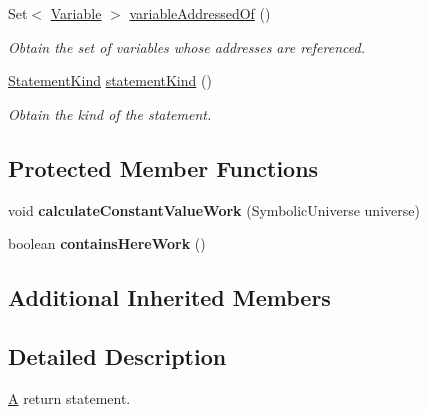\begin{DoxyCompactItemize}
Set$<$ \hyperlink{interfaceedu_1_1udel_1_1cis_1_1vsl_1_1civl_1_1model_1_1IF_1_1variable_1_1Variable}{Variable} $>$ \hyperlink{classedu_1_1udel_1_1cis_1_1vsl_1_1civl_1_1model_1_1common_1_1statement_1_1CommonReturnStatement_a6f24bbb13c09321034fa61796cd2c285}{variable\+Addressed\+Of} ()
\begin{DoxyCompactList}\small\item\em Obtain the set of variables whose addresses are referenced. \end{DoxyCompactList}\item 
\hyperlink{enumedu_1_1udel_1_1cis_1_1vsl_1_1civl_1_1model_1_1IF_1_1statement_1_1Statement_1_1StatementKind}{Statement\+Kind} \hyperlink{classedu_1_1udel_1_1cis_1_1vsl_1_1civl_1_1model_1_1common_1_1statement_1_1CommonReturnStatement_a6e136e75282e3269433eafc433c9c002}{statement\+Kind} ()
\begin{DoxyCompactList}\small\item\em Obtain the kind of the statement. \end{DoxyCompactList}\end{DoxyCompactItemize}
\subsection*{Protected Member Functions}
\begin{DoxyCompactItemize}
\item 
\hypertarget{classedu_1_1udel_1_1cis_1_1vsl_1_1civl_1_1model_1_1common_1_1statement_1_1CommonReturnStatement_ae08da09392269dd9f36463a691511893}{}void {\bfseries calculate\+Constant\+Value\+Work} (Symbolic\+Universe universe)\label{classedu_1_1udel_1_1cis_1_1vsl_1_1civl_1_1model_1_1common_1_1statement_1_1CommonReturnStatement_ae08da09392269dd9f36463a691511893}

\item 
\hypertarget{classedu_1_1udel_1_1cis_1_1vsl_1_1civl_1_1model_1_1common_1_1statement_1_1CommonReturnStatement_a988ba72d15f40ea5a0b1e79f74fc611a}{}boolean {\bfseries contains\+Here\+Work} ()\label{classedu_1_1udel_1_1cis_1_1vsl_1_1civl_1_1model_1_1common_1_1statement_1_1CommonReturnStatement_a988ba72d15f40ea5a0b1e79f74fc611a}

\end{DoxyCompactItemize}
\subsection*{Additional Inherited Members}


\subsection{Detailed Description}
\hyperlink{structA}{A} return statement. 

